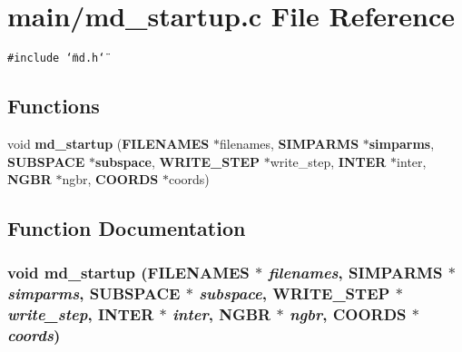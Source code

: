 \section{main/md\_\-startup.c File Reference}
\label{md__startup_8c}
{\tt \#include \char`\"{}md.h\char`\"{}}\par
\subsection*{Functions}
\begin{CompactItemize}
\item 
void {\bf md\_\-startup} ({\bf FILENAMES} $\ast$filenames, {\bf SIMPARMS} $\ast${\bf simparms}, {\bf SUBSPACE} $\ast${\bf subspace}, {\bf WRITE\_\-STEP} $\ast$write\_\-step, {\bf INTER} $\ast$inter, {\bf NGBR} $\ast$ngbr, {\bf COORDS} $\ast$coords)
\end{CompactItemize}


\subsection{Function Documentation}
\subsubsection{\setlength{\rightskip}{0pt plus 5cm}void md\_\-startup ({\bf FILENAMES} $\ast$ {\em filenames}, {\bf SIMPARMS} $\ast$ {\em simparms}, {\bf SUBSPACE} $\ast$ {\em subspace}, {\bf WRITE\_\-STEP} $\ast$ {\em write\_\-step}, {\bf INTER} $\ast$ {\em inter}, {\bf NGBR} $\ast$ {\em ngbr}, {\bf COORDS} $\ast$ {\em coords})}\label{md__startup_8c_b9947b2f9e17c9c24bf80327e8a84d72}


